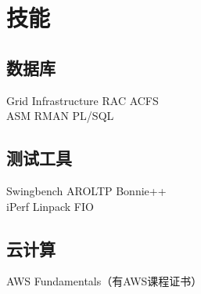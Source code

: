 \documentclass[]{deedy-resume-openfont}
\begin{document}
\begin{minipage}[t]{0.25\textwidth}


\section{技能}
\sectionsep
\subsection{数据库}
Grid Infrastructure \textbullet{} RAC \textbullet{} ACFS \\
ASM \textbullet{} RMAN \textbullet{} PL/SQL \textbullet{}  \\


\subsection{测试工具}
Swingbench \textbullet{} AROLTP \textbullet{} Bonnie++  \\
iPerf \textbullet{} Linpack \textbullet{} FIO  \\
\sectionsep

\subsection{云计算}
AWS Fundamentals（有AWS课程证书）

%
%

\end{minipage} 
\end{document}
